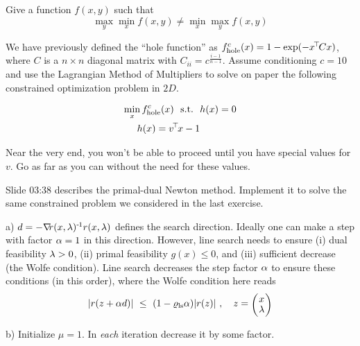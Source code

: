 

\renewcommand{\course}{Optimization}
\renewcommand{\coursepicture}{optim}
\renewcommand{\coursedate}{Summer 2015}
\renewcommand{\exnum}{6}

\exercises
{}
\exercisestitle


Give a function $f(x,y)$ such that
$$\max_y \min_x f(x,y) \not = \min_x \max_y f(x,y)$$


We have previously defined the ``hole function'' as $f^c_{\text{hole}}(x) =
1-\exp(-x^{\!\top\!} C x)$, where $C$ is a $n\times n$ diagonal matrix with $C_{ii} =
c^{\frac{i-1}{n-1}}$.  Assume conditioning $c=10$ and use the Lagrangian Method
of Multipliers to solve on paper the following constrained optimization problem
in $2D$.

\begin{align}
\min_x f^c_{\text{hole}}(x) ~~\text{s.t.}~~& h(x)=0 \\
h(x) = v^{\!\top\!} x - 1
\end{align}

Near the very end, you won't be able to proceed until you have special values
for $v$. Go as far as you can without the need for these values.


Slide 03:38 describes the primal-dual Newton method. Implement it to
solve the same constrained problem we considered in the last
exercise.

a) $d=-{\nabla_{\!\!}} r(x,\lambda)^{{\hspace*{-.0pt}\text{\rm -}\hspace*{-.5pt}}1} r(x,\lambda)$ defines the search direction. Ideally
one can make a step with factor $\alpha=1$ in this direction. However,
line search needs to ensure (i) dual feasibility $\lambda>0$, (ii) primal
feasibility $g(x)\le0$, and (iii) sufficient decrease (the Wolfe
condition). Line search decreases the step factor $\alpha$ to ensure these
conditions (in this order), where the Wolfe condition here reads
$$|r(z+\a d)| ~\le~ (1-\varrho_\text{ls}\a)|r(z)| \comma
z = \mat{c}{x\\\l} $$

b) Initialize $\mu=1$. In \emph{each} iteration decrease it by some
factor.

